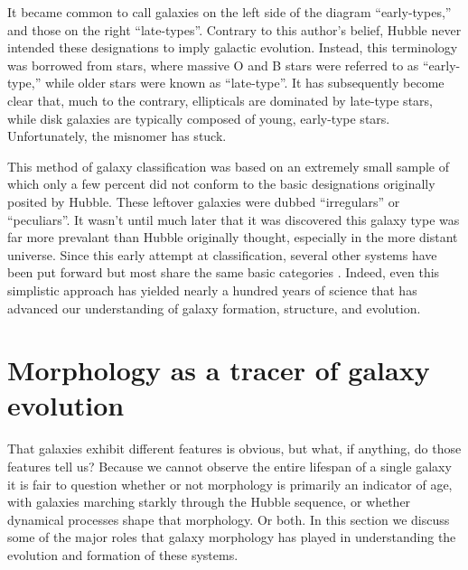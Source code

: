 It became common to call galaxies on the left side of the diagram ``early-types,'' and those on the right ``late-types''. Contrary to this author's belief, Hubble never intended these designations to imply galactic evolution. Instead, this terminology was borrowed from stars, where massive O and B stars were referred to as ``early-type,'' while older stars were known as ``late-type''\citep{Buta2011}. It has subsequently become clear that, much to the contrary, ellipticals are dominated by late-type stars, while disk galaxies are typically composed of young, early-type stars.  Unfortunately, the misnomer has stuck. 


This method of galaxy classification was based on an extremely small sample of which only a few percent did not conform to the basic designations originally posited by Hubble. These leftover galaxies were dubbed ``irregulars'' or ``peculiars''. It wasn't until much later that it was discovered this galaxy type was far more prevalant than Hubble originally thought, especially in the more distant universe. Since this early attempt at classification, several other systems have been put forward but most share the same basic categories \citep[e.g.,][]{deVaucouleurs1959, Conselice2006}. Indeed, even this simplistic approach has yielded nearly a hundred years of science that has advanced our understanding of galaxy formation, structure, and evolution. 
 

\section{Morphology as a tracer of galaxy evolution}
That galaxies exhibit different features is obvious, but what, if anything, do those features tell us? Because we cannot observe the entire lifespan of a single galaxy it is fair to question whether or not morphology is primarily an indicator of age, with galaxies marching starkly through the Hubble sequence, or whether dynamical processes shape that morphology. Or both. In this section we discuss some of the major roles that galaxy morphology has played in understanding the evolution and formation of these systems. 



